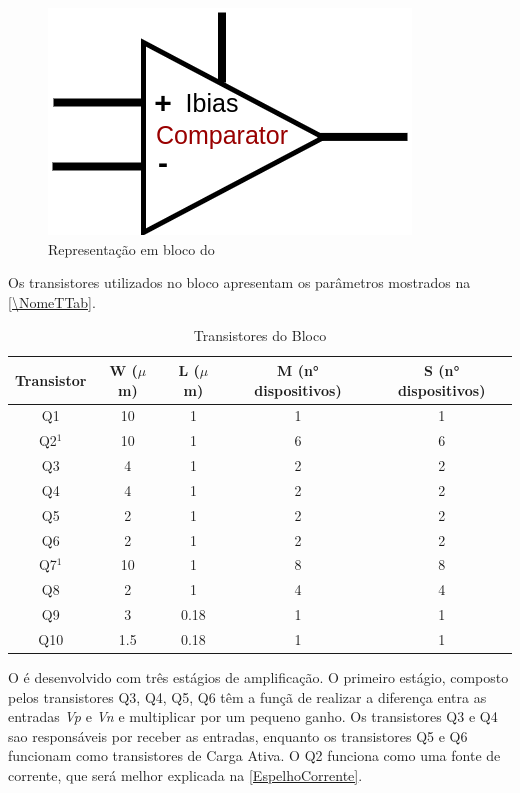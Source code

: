 \begin{figure}[htb]
 \centering
    \centering
    \caption{Representa{\c c}\~ao em bloco do \NomeBloco} \label{\NomeSFig}
    \includegraphics[scale=0.5]{Circuitos/Comparator_block.png}
\end{figure}

Os transistores utilizados no bloco \NomeBloco{} apresentam os par\^ametros mostrados na \autoref{\NomeTTab}.

\begin{table}[htbp]
\caption{Transistores do Bloco \NomeBloco}
\label{\NomeTTab}
\centering
\begin{tabular}{ccccc}
\toprule
Transistor & W ($\mu$m)  & L ($\mu$m)           & M (n° dispositivos) & S (n° dispositivos)\\
\midrule \midrule
Q1 & 10 & 1 & 1 & 1\\
\midrule
Q2$^1$ & 10 & 1 & 6 & 6\\
\midrule
Q3 & 4 & 1 & 2 & 2\\
\midrule
Q4 & 4 & 1 & 2 & 2\\
\midrule
Q5 & 2 & 1 & 2 & 2\\
\midrule
Q6 & 2 & 1 & 2 & 2\\
\midrule
Q7$^1$ & 10 & 1 & 8 & 8\\
\midrule
Q8 & 2 & 1 & 4 & 4\\
\midrule
Q9 & 3 & 0.18 & 1 & 1\\
\midrule
Q10 & 1.5 & 0.18 & 1 & 1\\

\bottomrule
\end{tabular}
\end{table}
 
O \NomeBloco{} \'e desenvolvido com tr\^es est\'agios de amplifica{\c c}\~ao. O primeiro est\'agio, composto pelos transistores Q3, Q4, Q5, Q6 t\^em a fun{\c c}\~a de realizar a diferen{\c c}a entra as entradas \emph{Vp} e \emph{Vn} e multiplicar por um pequeno ganho. Os transistores Q3 e Q4 sao respons\'aveis por receber as entradas, enquanto os transistores Q5 e Q6 funcionam como transistores de Carga Ativa. O Q2 funciona como uma fonte de corrente, que ser\'a melhor explicada na \autoref{EspelhoCorrente}.

